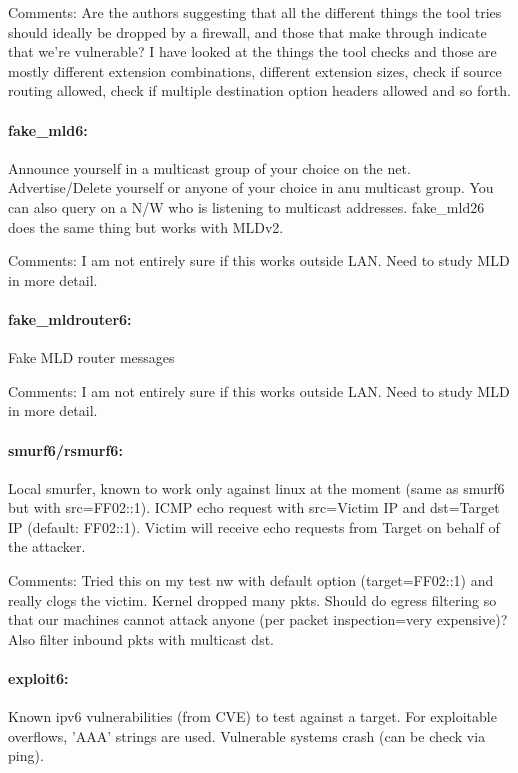 \documentclass{article}
\begin{document}
Comments: Are the authors suggesting that all the different things the tool tries should ideally be dropped by a firewall, and those that make through indicate that we're vulnerable? I have looked at the things the tool checks and those are mostly different extension combinations, different extension sizes, check if source routing allowed, check if multiple destination option headers allowed and so forth.

\paragraph*{fake\_mld6:} Announce yourself in a multicast group of your choice on the net. Advertise/Delete yourself or anyone of your choice in anu multicast group. You can also query on a N/W who is listening to multicast addresses. fake\_mld26 does the same thing but works with MLDv2.

Comments: I am not entirely sure if this works outside LAN. Need to study MLD in more detail. 

\paragraph*{fake\_mldrouter6:} Fake MLD router messages

Comments: I am not entirely sure if this works outside LAN. Need to study MLD in more detail. 

\paragraph*{smurf6/rsmurf6:} Local smurfer, known to work only against linux at the moment (same as smurf6 but with src=FF02::1). ICMP echo request with src=Victim IP and dst=Target IP (default: FF02::1). Victim will receive echo requests from Target on behalf of the attacker.

Comments: Tried this on my test nw with default option (target=FF02::1) and really clogs the victim. Kernel dropped many pkts. Should do egress filtering so that our machines cannot attack anyone (per packet inspection=very expensive)? Also filter inbound pkts with multicast dst.

\paragraph*{exploit6:} Known ipv6 vulnerabilities (from CVE) to test against a target. For exploitable overflows, 'AAA' strings are used. Vulnerable systems crash (can be check via ping).
\end{document}
